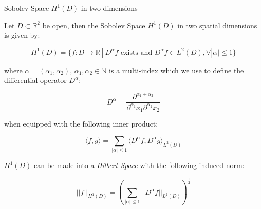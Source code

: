 \begin{definition}\label{def:twod-H1-D}
    Sobolev Space $H^1(D)$ in two dimensions

    Let $D \subset \mathbb{R}^2$ be open, then the Sobolev Space $H^1(D)$ in
    two spatial dimensions is given by:

    \begin{equation}\label{eq:twod-H1-D}
        H^1(D) = \{f: D \rightarrow \mathbb{R}\ |\
            D^\alpha f \text{ exists and } D^\alpha f \in L^2(D),
            \forall |\alpha| \leq 1 \}
    \end{equation}

    where $\alpha = (\alpha_1, \alpha_2)$, $\alpha_1, \alpha_2 \in \mathbb{N}$
    is a multi-index which we use to define the differential operator $D^\alpha$:

    \[
        D^\alpha = \frac{\partial^{\alpha_1 + \alpha_2}}
        {\partial^{\alpha_1}x_1\partial^{\alpha_2}x_2}
    \]

    when equipped with the following inner product:

    \begin{equation}\label{eq:twod-H1-D-inner-product}
        \langle f, g\rangle =
            \sum_{|\alpha| \leq 1}\langle D^\alpha f, D^\alpha g \rangle_{L^2(D)}
    \end{equation}

    $H^1(D)$ can be made into a \textit{Hilbert Space} with the following
    induced norm:

    \begin{equation}\label{eq:twod-H1-D-norm}
        ||f||_{H^1(D)} =
         \left(\sum_{|\alpha| \leq 1}||D^\alpha f||_{L^2(D)}\right)^\frac{1}{2}
    \end{equation}
\end{definition}

